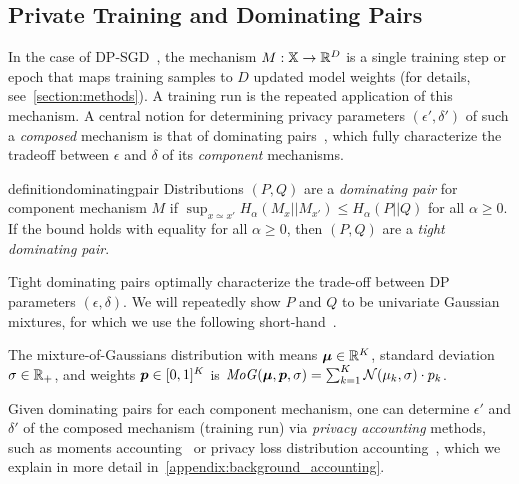 \subsection{Private Training and Dominating Pairs}
In the case of DP-SGD~\cite{song2013stochastic}, the mechanism $M : {\mathbb{X}} \rightarrow {\mathbb{R}}^D$ is a single training step or epoch that maps training samples to $D$ updated model weights (for details, see~\cref{section:methods}).
A training run is the repeated application of this mechanism.
A central notion for determining privacy parameters $(\epsilon',\delta')$ of such a \emph{composed} mechanism is that of dominating pairs~\cite{zhu2022optimal}, which fully characterize the tradeoff between $\epsilon$ and $\delta$ of its \emph{component} mechanisms.
\begin{restatable}{definition}{dominatingpair}\label{definition:dominating_pair}
    Distributions $(P,Q)$ are a \emph{dominating pair} for component mechanism $M$ if $\sup_{x \simeq x'} H_\alpha(M_x ||M_{x'}) \leq H_\alpha(P || Q)$ for all $\alpha \geq 0$.
    If the bound holds with equality for all $\alpha \geq 0$, then $(P,Q)$ are a \emph{tight dominating pair}.
\end{restatable}
Tight dominating pairs optimally characterize the trade-off between DP parameters $(\epsilon, \delta)$.
We will repeatedly show $P$ and $Q$ to be univariate Gaussian mixtures, for which we use the following short-hand~\cite{Choquette2024}.
\begin{definition}\label{definition:mixture_of_gaussians}
    The mixture-of-Gaussians distribution with means ${\bm{\mu}} \in {\mathbb{R}}^K$, standard deviation $\sigma \in {\mathbb{R}}_+$, and weights ${\bm{p}} \in [0,1]^K$ is
    $\mathit{MoG}({\bm{\mu}}, {\bm{p}},  \sigma) = \sum_{k=1}^K \mathcal{N}({\mu}_k, \sigma) \cdot {p}_k$.
\end{definition}

Given dominating pairs for each component mechanism, one can determine $\epsilon'$ and $\delta'$ of the composed mechanism (training run) via \emph{privacy accounting} methods, such as moments accounting~\cite{abadi2016deep} or privacy loss distribution accounting~\cite{Meiser2018Buckets,sommer2018privacy}, which we explain in more detail in~\cref{appendix:background_accounting}.

